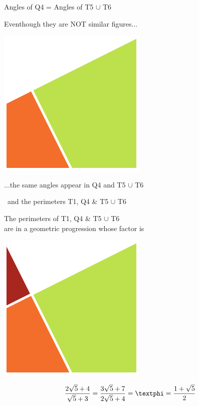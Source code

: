 \documentclass[14pt]{beamer}
\begin{document}
    \begin{frame}{Angles of Q4 = Angles of T5 $\cup$ T6}
        \begin{center}
            Eventhough they are NOT similar figures...
            \bigskip \bigskip

            \includegraphics[height=20ex]{figures/figure001g.pdf}

            \bigskip \bigskip

            ...the same angles appear in Q4 and T5 $\cup$ T6
        \end{center}
    \end{frame}


    \begin{frame}{\textphi\ and the perimeters T1, Q4 \& T5 $\cup$ T6}
        \begin{center}
            The perimeters of T1, Q4 \& T5 $\cup$ T6\\are in a geometric progression whose factor is \textphi

            \bigskip \bigskip

            \includegraphics[height=15ex]{figures/figure001h.pdf}

            $$\frac{2\sqrt{5} + 4}{\sqrt{5} + 3} = \frac{3\sqrt{5} + 7}{2\sqrt{5} + 4} = \text{\textphi} = \frac{1+\sqrt{5}}{2}$$
        \end{center}
    \end{frame}

\end{document}
